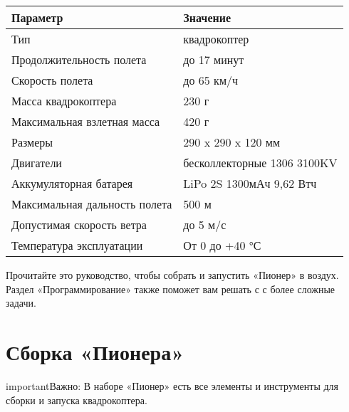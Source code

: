 \documentclass[a4paper,10pt,russian]{sphinxmanual}
\begin{document}
\begin{savenotes}\sphinxattablestart
\centering
{}
\label{\detokenize{index:id3}}
\sphinxaftercaption
\begin{tabulary}{\linewidth}[t]{|T|T|}
\hline
\sphinxstyletheadfamily 
Параметр
&\sphinxstyletheadfamily 
Значение
\\
\hline
Тип
&
квадрокоптер
\\
\hline
Продолжительность полета
&
до 17 минут
\\
\hline
Скорость полета
&
до 65 км/ч
\\
\hline
Масса квадрокоптера
&
230 г
\\
\hline
Максимальная взлетная масса
&
420 г
\\
\hline
Размеры
&
290 x 290 x 120 мм
\\
\hline
Двигатели
&
бесколлекторные 1306 3100KV
\\
\hline
Аккумуляторная батарея
&
LiPo 2S 1300мАч 9,62 Втч
\\
\hline
Максимальная дальность полета
&
500 м
\\
\hline
Допустимая скорость ветра
&
до 5 м/с
\\
\hline
Температура эксплуатации
&
От 0 до +40 °С
\\
\hline
\end{tabulary}
\par
\sphinxattableend\end{savenotes}

Прочитайте это руководство, чтобы собрать и запустить «Пионер» в воздух. Раздел «Программирование» также поможет вам решать с с более сложные задачи.


\chapter{Сборка «Пионера»}
\label{\detokenize{const/const_main:id1}}\label{\detokenize{const/const_main::doc}}
\begin{sphinxadmonition}{important}{Важно:}
В наборе «Пионер» есть все элементы и инструменты для сборки и запуска квадрокоптера.
\end{sphinxadmonition}


\end{document}
